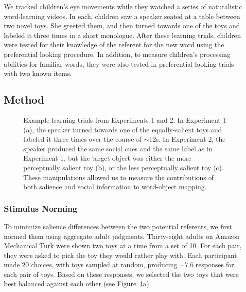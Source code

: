 \documentclass[man,floatsintext]{apa6}
\begin{document}
We tracked children's eye movements while they watched a series of naturalistic word-learning videos. In each, children saw a speaker seated at a table between two novel toys. She greeted them, and then turned towards one of the toys and labeled it three times in a short monologue. After these learning trials, children were tested for their knowledge of the referent for the new word using the preferential looking procedure. In addition, to measure children's processing abilities for familiar words, they were also tested in preferential looking trials with two known items.

\subsection{Method}

\begin{figure}[tb]
	\caption{\label{fig:design} Example learning trials from Experiments 1 and 2. In Experiment 1 (a), the speaker turned towards one of the equally-salient toys and labeled it three times over the course of $\sim$12s. In Experiment 2, the speaker produced the same social cues and the same label as in Experiment 1, but the target object was either the more perceptually salient toy (b), or the less perceptually salient toy (c). These manipulations allowed us to measure the contributions of both salience and social information to word-object mapping.}
\end{figure}

\subsubsection{Stimulus Norming}
To minimize salience differences between the two potential referents, we first normed them using aggregate adult judgments. Thirty-eight adults on Amazon Mechanical Turk were shown two toys at a time from a set of 10. For each pair, they were asked to pick the toy they would rather play with. Each participant made 20 choices, with toys sampled at random, producing $\sim$7.6 responses for each pair of toys. Based on these responses, we selected the two toys that were best balanced against each other (see Figure~\ref{fig:design}a).
\end{document}
